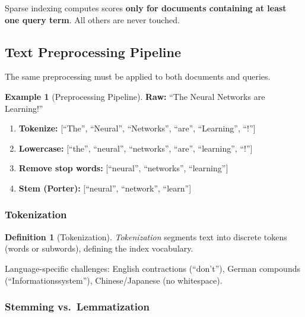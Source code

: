 \documentclass[11pt,a4paper]{article}
\theoremstyle{definition}
\newtheorem{definition}{Definition}[section]
\newtheorem{example}{Example}[section]
\theoremstyle{plain}
\begin{document}
\begin{center}

\end{center}

\begin{keytakeaway}
Sparse indexing computes scores \textbf{only for documents containing at least one query term}. All others are never touched.
\end{keytakeaway}

\subsection{Text Preprocessing Pipeline}
\label{sec:preprocessing}

The same preprocessing must be applied to both documents and queries.

\begin{center}

\end{center}

\begin{example}[Preprocessing Pipeline]
\textbf{Raw:} ``The Neural Networks are Learning!''
\begin{enumerate}[nosep]
    \item \textbf{Tokenize:} [``The'', ``Neural'', ``Networks'', ``are'', ``Learning'', ``!'']
    \item \textbf{Lowercase:} [``the'', ``neural'', ``networks'', ``are'', ``learning'', ``!'']
    \item \textbf{Remove stop words:} [``neural'', ``networks'', ``learning'']
    \item \textbf{Stem (Porter):} [``neural'', ``network'', ``learn'']
\end{enumerate}
\end{example}

\subsubsection{Tokenization}

\begin{definition}[Tokenization]
\emph{Tokenization} segments text into discrete tokens (words or subwords), defining the index vocabulary.
\end{definition}

Language-specific challenges: English contractions (``don't''), German compounds (``Informationssystem''), Chinese/Japanese (no whitespace).

\subsubsection{Stemming vs.\ Lemmatization}
\end{document}
